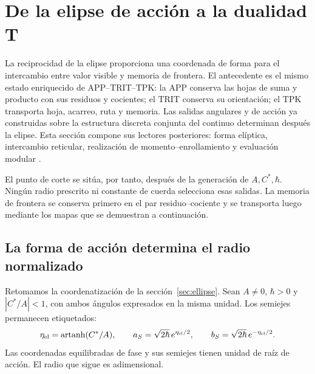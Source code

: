 
\section{De la elipse de acción a la dualidad T}
\label{sec:ii-dualidad-t}

La reciprocidad de la elipse proporciona una coordenada de forma para el
intercambio entre valor visible y memoria de frontera. El antecedente es el
mismo estado enriquecido de APP--TRIT--TPK: la APP conserva las hojas de
suma y producto con sus residuos y cocientes; el TRIT conserva su orientación;
el TPK transporta hoja, acarreo, ruta y memoria. Las salidas angulares y de
acción ya construidas sobre la estructura discreta conjunta del continuo
determinan después la elipse. Esta sección compone sus lectores posteriores:
forma elíptica, intercambio reticular, realización de momento--enrollamiento
y evaluación modular \cite{elipse,hmtedicionintegral}.

El punto de corte se sitúa, por tanto, después de la generación de
\(A,C^*,\hbar\). Ningún radio prescrito ni constante de cuerda selecciona
esas salidas. La memoria de frontera se conserva primero en el par
residuo--cociente y se transporta luego mediante los mapas que se demuestran
a continuación.

\subsection{La forma de acción determina el radio normalizado}

Retomamos la coordenatización de la sección~\ref{sec:ellipse}. Sean \(A\ne0\),
\(\hbar>0\) y \(|C^*/A|<1\), con ambos ángulos expresados en la misma
unidad. Los semiejes permanecen etiquetados:
\begin{equation}
 \eta_{\rm el}=\operatorname{artanh}(C^*/A),\qquad
 a_S=\sqrt{2\hbar}\,e^{\eta_{\rm el}/2},\qquad
 b_S=\sqrt{2\hbar}\,e^{-\eta_{\rm el}/2}.
 \label{eq:ii-t-elipse}
\end{equation}
Las coordenadas equilibradas de fase y sus semiejes tienen unidad de raíz
de acción. El radio que sigue es adimensional.

